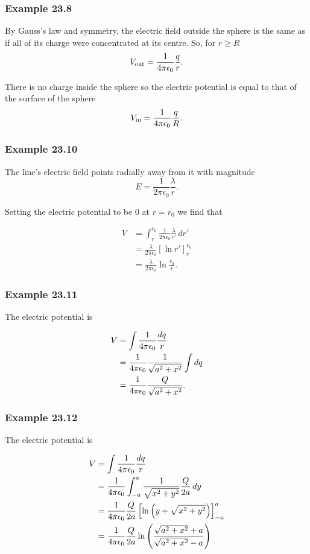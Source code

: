 \documentclass{article}
\begin{document}
\subsubsection{Example 23.8}

By Gauss's law and symmetry, the electric field outside the sphere is the same as if all of its charge were concentrated at its centre. So, for $r \ge R$ \[V_\textrm{out} = \frac{1}{4 \pi \epsilon_0} \frac{q}{r}.\]

There is no charge inside the sphere so the electric potential is equal to that of the surface of the sphere \[V_\textrm{in} = \frac{1}{4 \pi \epsilon_0} \frac{q}{R}.\]

\subsubsection{Example 23.10}

The line's electric field points radially away from it with magnitude \[E = \frac{1}{2 \pi \epsilon_0} \frac{\lambda}{r}.\]

Setting the electric potential to be $0$ at $r = r_0$ we find that

\begin{align*}
  V & = \int_r^{r_0} \frac{1}{2 \pi \epsilon_0} \frac{\lambda}{r'} \,dr' \\
    & = \frac{\lambda}{2 \pi \epsilon_0} \left[ \ln r' \right]_r^{r_0}   \\
    & = \frac{\lambda}{2 \pi \epsilon_0} \ln{\frac{r_0}{r}}.
\end{align*}

\subsubsection{Example 23.11}

The electric potential is

\begin{align*}
  V & = \int \frac{1}{4 \pi \epsilon_0} \frac{dq}{r}                  \\
    & = \frac{1}{4 \pi \epsilon_0} \frac{1}{\sqrt{a^2 + x^2}} \int dq \\
    & = \frac{1}{4 \pi \epsilon_0} \frac{Q}{\sqrt{a^2 + x^2}}.
\end{align*}

\subsubsection{Example 23.12}

The electric potential is

\begin{align*}
  V & = \int \frac{1}{4 \pi \epsilon_0} \frac{dq}{r}                                                                  \\
    & = \frac{1}{4 \pi \epsilon_0} \int_{-a}^a \frac{1}{\sqrt{x^2 + y^2}} \frac{Q}{2 a} \,dy                          \\
    & = \frac{1}{4 \pi \epsilon_0} \frac{Q}{2 a} \left[ \ln \left( y + \sqrt{x^2 + y^2} \right) \right]_{-a}^a        \\
    & = \frac{1}{4 \pi \epsilon_0} \frac{Q}{2 a} \ln \left( \frac{\sqrt{a^2 + x^2} + a}{\sqrt{a^2 + x^2} - a} \right)
\end{align*}
\end{document}
